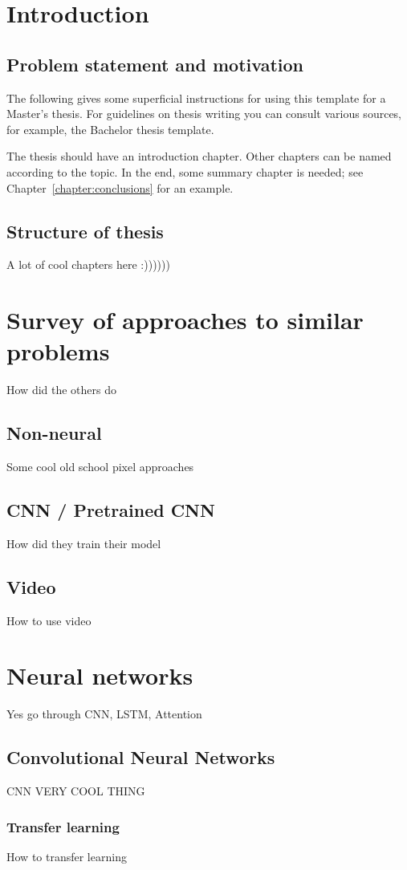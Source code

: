 \chapter{Introduction}
\section{Problem statement and motivation}
The following gives some superficial instructions for using this template for a Master's thesis. For guidelines on thesis writing you can consult various sources, for example, the Bachelor thesis template.

The thesis should have an introduction chapter. Other chapters can be named according to the topic. In the end, some summary chapter is needed; see Chapter~\ref{chapter:conclusions} for an example.

\section{Structure of thesis}
A lot of cool chapters here :))))))

\chapter{Survey of approaches to similar problems}
How did the others do
\section{Non-neural}
Some cool old school pixel approaches
\section{CNN / Pretrained CNN}
How did they train their model
\section{Video}
How to use video

\chapter{Neural networks}
Yes go through CNN, LSTM, Attention
\section{Convolutional Neural Networks}
CNN VERY COOL THING

\subsection{Transfer learning}
How to transfer learning
